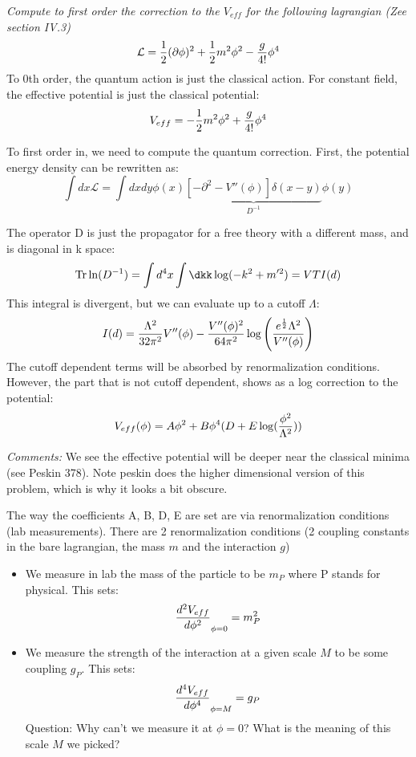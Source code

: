 \documentclass[11pt]{scrartcl}
\begin{document}
\begin{example}
\emph{Compute to first order the correction to the $V_{eff}$ for the following lagrangian (Zee section IV.3)}
$$ \mathcal{L} = \frac12 (\partial \phi)^2 + \frac12 m^2 \phi^2 - {g \over 4!} \phi^4$$
To 0th order, the quantum action is just the classical action.  For constant field, the effective potential is just the classical potential:
$$V_{eff} =  -\frac12 m^2 \phi^2 + {g \over 4!} \phi^4$$

To first order in, we need to compute the quantum correction.  First, the potential energy density can be rewritten as:
$$ \int dx \mathcal{L} = \int dx dy \phi(x) \underbrace{[-\partial^2 - V''(\phi)] \delta(x-y)}_{D^{-1}} \phi(y)$$ 

The operator D is just the propagator for a free theory with a different mass, and is diagonal in k space:
\begin{align}
\text{Tr} \ln(D^{-1}) = \int d^4 x \int \dkk \log({-k^2 + m'^2})  
= V T I(d) 
\end{align}
This integral is divergent, but we can evaluate up to a cutoff $\Lambda$:
\begin{align}
I(d) = {\Lambda^2 \over 32 \pi^2} V''(\phi) - {V''(\phi)^2 \over 64 \pi^2} \log \left({e^{\frac12} \Lambda^2 \over V''(\phi)} \right)
\end{align}
The cutoff dependent terms will be absorbed by renormalization conditions.  However, the part that is not cutoff dependent, shows
as a log correction to the potential:
\begin{align}
V_{eff} (\phi) = A \phi^2 + B \phi^4 (D + E \log({\phi^2 \over \Lambda^2}))
\end{align}
\end{example}
\emph{Comments:}
We see the effective potential will be deeper near the classical minima (see Peskin 378).  Note peskin does the higher dimensional
version of this problem, which is why it looks a bit obscure.  

The way the coefficients A, B, D, E are set are via renormalization conditions (lab measurements).
There are 2 renormalization conditions (2 coupling constants in the bare lagrangian, the mass $m$ and the interaction $g$)
\begin{itemize}
\item We measure in lab the mass of the particle to be $m_P$ where P stands for physical.  This sets: $${d^2 V_{eff} \over d \phi^2}_{\phi=0} = m_P^2$$
\item We measure the strength of the interaction at a given scale $M$ to be some coupling $g_P$.  This sets:
$$ {d^4 V_{eff} \over d \phi^4}_{\phi = M} = g_P$$
Question: Why can't we measure it at $\phi = 0$?  What is the meaning of this scale $M$ we picked?
\end{itemize}
\end{document}
